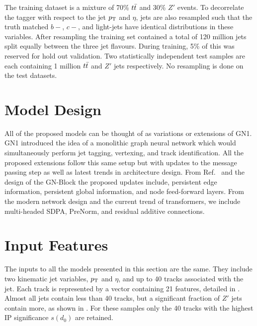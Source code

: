 The training dataset is a mixture of 70\% $t\bar{t}$ and 30\% $Z'$ events.
To decorrelate the tagger with respect to the jet $p_{\text{T}}$ and $\eta$, jets are also resampled such that the truth matched $b-$, $c-$, and light-jets have identical distributions in these variables.
After resampling the training set contained a total of 120 million jets split equally between the three jet flavours.
During training, 5\% of this was reserved for hold out validation.
Two statistically independent test samples are each containing 1 million $t\bar{t}$ and $Z'$ jets respectively.
No resampling is done on the test datasets.

\section{Model Design}

All of the proposed models can be thought of as variations or extensions of GN1.
GN1 introduced the idea of a monolithic graph neural network which would simultaneously perform jet tagging, vertexing, and track identification.
All the proposed extensions follow this same setup but with updates to the message passing step as well as latest trends in architecture design.
From Ref.~\cite{RelationalInductiveBiases} and the design of the GN-Block the proposed updates include, persistent edge information, persistent global information, and node feed-forward layers.
From the modern network design and the current trend of transformers, we include multi-headed SDPA, PreNorm, and residual additive connections.

\section{Input Features}

The inputs to all the models presented in this section are the same.
They include two kinematic jet variables, $p_{\text{T}}$ and $\eta$, and up to 40 tracks associated with the jet.
Each track is represented by a vector containing 21 features, detailed in .
Almost all \ttbar jets contain less than 40 tracks, but a significant fraction of $Z'$ jets contain more, as shown in .
For these samples only the 40 tracks with the highest IP significance $s(d_0)$ are retained.

